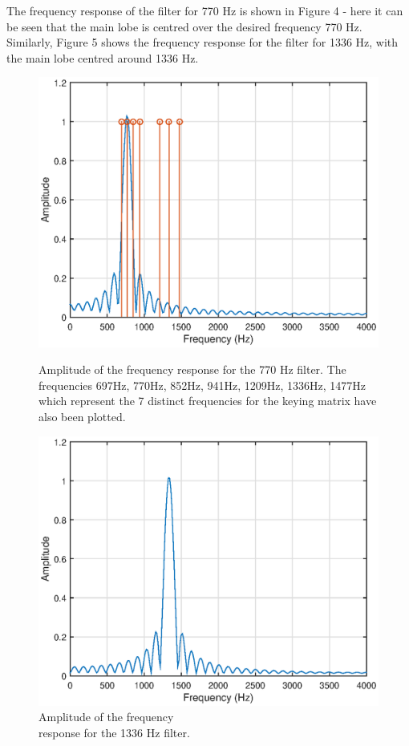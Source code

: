 \documentclass{article}
\begin{document}
The frequency response of the filter for 770 $\si{\hertz}$ is shown in Figure 4 - here it can be seen that the main lobe is centred over the desired frequency 770 $\si{\hertz}$. Similarly, Figure 5 shows the frequency response for the filter for 1336 $\si{\hertz}$, with the main lobe centred around 1336 $\si{\hertz}$.

\begin{figure}[H]
	\begin{minipage}[t]{0.5\linewidth}
		\includegraphics[scale=0.5]{fig3}
		\caption{Amplitude of the frequency response for the 770 $\si{\hertz}$ filter. The frequencies 697$\si{\hertz}$, 770$\si{\hertz}$, 852$\si{\hertz}$, 941$\si{\hertz}$, 1209$\si{\hertz}$, 1336$\si{\hertz}$, 1477$\si{\hertz}$ which represent the 7 distinct frequencies for the keying matrix have also been plotted.}
	\end{minipage}
	\hspace{0.5cm}
	\begin{minipage}[t]{0.5\linewidth}
		\includegraphics[scale=0.5]{fig4}
		\caption{Amplitude of the frequency\\ response for the 1336 $\si{\hertz}$ filter.}
	\end{minipage}
\end{figure}
\end{document}
